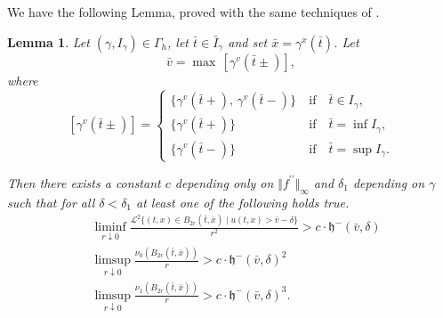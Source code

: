 \documentclass[11pt, twoside, reqno]{amsart}
\newtheorem{lemma}[thm]{Lemma}
\theoremstyle{definition}
\theoremstyle{remark}
\numberwithin{equation}{section}
\newcommand{\second}{{\prime \prime}}
\newcommand{\msc}[1]{\mathscr{#1}}
\begin{document}
We have the following Lemma, proved with the same techniques of \cite[Lemma~4.6]{Mar23}.
\begin{lemma}\label{lemma:hypreg}
    Let $(\gamma, I_{\gamma}) \in \Gamma_h$,  let $\bar t \in \bar I_{\gamma}$ and set $\bar x = \gamma^x(\bar t)$. Let 
    $$\bar v = \max\, [\gamma^v(\bar t\pm)],
$$
    where 
    $$
    [\gamma^v(\bar t\pm)]=
    \begin{cases}
      \{\gamma^v(\bar t+),\, \gamma^v(\bar t-)\}
        \  &\text{if}\quad  \bar t \in I_{\gamma},
        \\
        \{\gamma^v(\bar t+)\}
        \   &\text{if}\quad  \bar t = \inf I_\gamma,
        \\
        \{\gamma^v(\bar t-)\}
        \   &\text{if}\quad  \bar t = \sup I_\gamma.
    \end{cases}
    $$
    
    Then there exists a constant $c$ depending only on $\Vert f^{\second}\Vert_{\infty}$ and $\delta_1$ depending on $\gamma$ such that for all $\delta < \delta_1$ at least one of the following holds true.
    \begin{equation}
    \begin{aligned}
       &  \liminf _{r \downarrow 0} \frac{\msc L^2 \big\{(t, x) \in B_{2r}(\bar t, \bar x) \; \big| \; u(t,x) > \bar v-\delta\big\}}{r^2} > c \cdot \mathfrak h^-(\bar v, \delta)\\
   & \limsup_{r \downarrow 0} \frac{\nu_0(B_{2r}(\bar t, \bar x))}{r} > c \cdot \mathfrak h^-(\bar v, \delta)^2\\
   & \limsup_{r \downarrow 0} \frac{\nu_1(B_{2r}(\bar t, \bar x))}{r} > c \cdot \mathfrak h^-(\bar v, \delta)^3.
        \end{aligned}
\end{equation}
\end{lemma}
\end{document}
